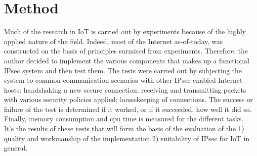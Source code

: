 \documentclass[final,letterpaper,twoside,12pt,twocolumn]{report}
\begin{document}






					
\section{Method}
Much of the research in IoT is carried out by experiments because of the highly applied nature of the field. Indeed, most of the Internet as-of-today, was constructed on the basis of principles surmised from experiments. Therefore, the author decided to  implement the various components that makes up a functional IPsec system and then test them. The tests were carried out by subjecting the system to common communication scenarios with other IPsec-enabled Internet hosts: handshaking a new secure connection; receiving and transmitting packets with various security policies applied; housekeeping of connections. The success or failure of the test is determined if it worked, or if it succeeded, how well it did so. Finally, memory consumption and cpu time is measured for the different tasks. It's the results of these tests that will form the basis of the evaluation of the 1) quality and workmanship of the implementation 2) suitability of IPsec for IoT in general.
\end{document}
